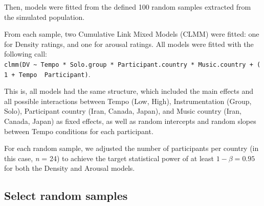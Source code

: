 \documentclass[
  bookmarksnumbered]{article}
\begin{document}
Then, models were fitted from the defined 100 random samples extracted from the simulated population.

From each sample, two Cumulative Link Mixed Models (CLMM) were fitted: one for Density ratings, and one for arousal ratings. All models were fitted with the following call: \texttt{clmm(DV\ \textasciitilde{}\ Tempo\ *\ Solo.group\ *\ Participant.country\ *\ Music.country\ +\ (1\ +\ Tempo\ \textbar{}\ Participant)}.

This is, all models had the same structure, which included the main effects and all possible interactions between Tempo (Low, High), Instrumentation (Group, Solo), Participant country (Iran, Canada, Japan), and Music country (Iran, Canada, Japan) as fixed effects, as well as random intercepts and random slopes between Tempo conditions for each participant.

For each random sample, we adjusted the number of participants per country (in this case, \emph{n} = 24) to achieve the target statistical power of at least \(1 - \beta = 0.95\) for both the Density and Arousal models.

\hypertarget{select-random-samples}{%
\subsection{Select random samples}\label{select-random-samples}}
\end{document}
